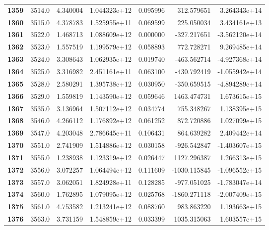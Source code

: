 \documentclass{report}[12pt]
\begin{document}
\begin{center}
\begin{tabular}{lrrrrrr}
\textbf{1359} &         3514.0 &   4.340004 &  1.044323e+12 &    0.095996 &   312.579651 &  3.264343e+14 \\
\textbf{1360} &         3515.0 &   4.378783 &  1.525955e+11 &    0.069599 &   225.050034 &  3.434161e+13 \\
\textbf{1361} &         3522.0 &   1.468713 &  1.088609e+12 &    0.000000 &  -327.217651 & -3.562120e+14 \\
\textbf{1362} &         3523.0 &   1.557519 &  1.199579e+12 &    0.058893 &   772.728271 &  9.269485e+14 \\
\textbf{1363} &         3524.0 &   3.308643 &  1.062935e+12 &    0.019740 &  -463.562714 & -4.927368e+14 \\
\textbf{1364} &         3525.0 &   3.316982 &  2.451161e+11 &    0.063100 &  -430.792419 & -1.055942e+14 \\
\textbf{1365} &         3528.0 &   2.580291 &  1.395738e+12 &    0.030950 &  -350.659515 & -4.894289e+14 \\
\textbf{1366} &         3529.0 &   1.559819 &  1.143590e+12 &    0.059646 &  1463.474731 &  1.673615e+15 \\
\textbf{1367} &         3535.0 &   3.136964 &  1.507112e+12 &    0.034774 &   755.348267 &  1.138395e+15 \\
\textbf{1368} &         3546.0 &   4.266112 &  1.176892e+12 &    0.061252 &   872.720886 &  1.027099e+15 \\
\textbf{1369} &         3547.0 &   4.203048 &  2.786645e+11 &    0.106431 &   864.639282 &  2.409442e+14 \\
\textbf{1370} &         3551.0 &   2.741909 &  1.514886e+12 &    0.030158 &  -926.542847 & -1.403607e+15 \\
\textbf{1371} &         3555.0 &   1.238938 &  1.123319e+12 &    0.026447 &  1127.296387 &  1.266313e+15 \\
\textbf{1372} &         3556.0 &   3.072257 &  1.064494e+12 &    0.111609 & -1030.115845 & -1.096552e+15 \\
\textbf{1373} &         3557.0 &   3.062051 &  1.824928e+11 &    0.128285 &  -977.051025 & -1.783047e+14 \\
\textbf{1374} &         3560.0 &   1.762895 &  1.079095e+12 &    0.025768 & -1860.271118 & -2.007409e+15 \\
\textbf{1375} &         3561.0 &   4.753582 &  1.213241e+12 &    0.088760 &   983.863220 &  1.193663e+15 \\
\textbf{1376} &         3563.0 &   3.731159 &  1.548859e+12 &    0.033399 &  1035.315063 &  1.603557e+15 \\

\end{tabular}
\end{center}
\end{document}
